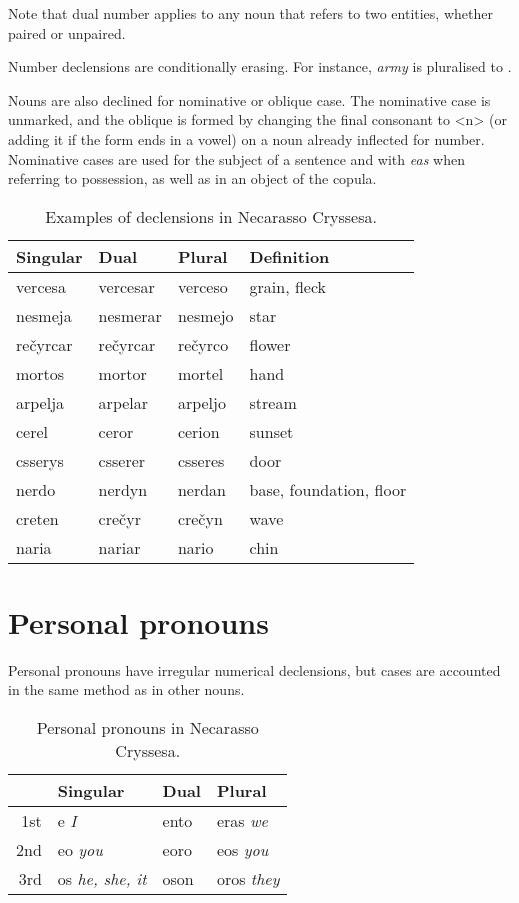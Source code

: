 \documentclass{book}
\begin{document}
Note that dual number applies to any noun that refers to two entities, whether paired or unpaired.

Number declensions are conditionally erasing. For instance,  \emph{army} is pluralised to .

Nouns are also declined for nominative or oblique case. The nominative case is unmarked, and the oblique is formed by changing the final consonant to <n> (or adding it if the form ends in a vowel) on a noun already inflected for number. Nominative cases are used for the subject of a sentence and with \emph{eas} when referring to possession, as well as in an object of the copula.

\begin{table}[htb]
  \caption{Examples of declensions in Necarasso Cryssesa.}
  \centering
  \begin{tabular}{|l|l|l|l|}
    \hline
    Singular & Dual & Plural & Definition \\ \hline
    vercesa & vercesar & verceso & grain, fleck \\
    nesmeja & nesmerar & nesmejo & star \\
    rečyrcar & rečyrcar & rečyrco & flower \\
    mortos & mortor & mortel & hand \\
    arpelja & arpelar & arpeljo & stream \\
    cerel & ceror & cerion & sunset \\
    csserys & csserer & csseres & door \\
    nerdo & nerdyn & nerdan & base, foundation, floor \\
    creten & crečyr & crečyn & wave \\
    naria & nariar & nario & chin \\ \hline
  \end{tabular}
\end{table}

\section{Personal pronouns}

Personal pronouns have irregular numerical declensions, but cases are accounted in the same method as in other nouns.

\begin{table}[h]
  \caption{Personal pronouns in Necarasso Cryssesa.}
  \centering
  \begin{tabu}{|r|X|X|X|}
    \hline
    & Singular & Dual & Plural \\ \hline
    1st & e \emph{I} & ento & eras \emph{we} \\ \hline
    2nd & eo \emph{you} & eoro & eos \emph{you} \\ \hline
    3rd & os \emph{he, she, it} & oson & oros \emph{they} \\ \hline
  \end{tabu}
\end{table}
\end{document}
